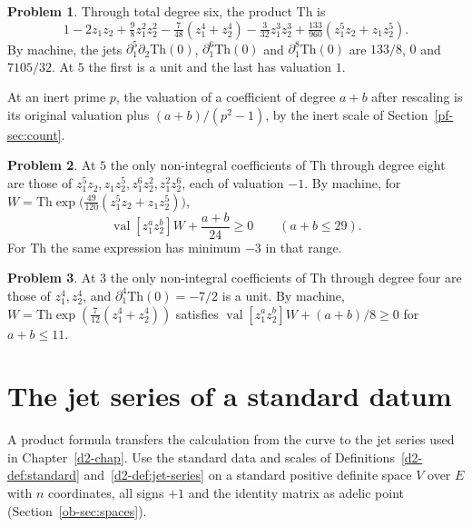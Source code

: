 \documentclass[reqno]{amsart}
\newcounter{chap}
\theoremstyle{plain}
\theoremstyle{definition}
\newtheorem{problem}{Problem}[section]
\theoremstyle{remark}
\newcommand{\val}{\operatorname{val}}
\newcommand{\Thm}{\mathrm{Th}}
\begin{document}
\begin{problem}\label{pr:jets}
Through total degree six, the product \(\Thm\) is
\[
 1-2z_1z_2+\tfrac98 z_1^2z_2^2-\tfrac7{48}(z_1^4+z_2^4)
   -\tfrac3{32}z_1^3z_2^3+\tfrac{133}{960}(z_1^5z_2+z_1z_2^5).
\]
By machine, the jets \(\partial_1^5\partial_2\Thm(0)\), \(\partial_1^6\Thm(0)\) and \(\partial_1^8\Thm(0)\) are \(133/8\), \(0\) and \(7105/32\).  At \(5\) the first is a unit and the last has valuation \(1\).
\end{problem}

At an inert prime \(p\), the valuation of a coefficient of degree \(a+b\) after rescaling is its original valuation plus \((a+b)/(p^2-1)\), by the inert scale of Section~\ref{pf-sec:count}.

\begin{problem}\label{pr:remove-five}
At \(5\) the only non-integral coefficients of \(\Thm\) through degree eight are those of \(z_1^5z_2,z_1z_2^5,z_1^6z_2^2,z_1^2z_2^6\), each of valuation \(-1\).
By machine, for \(W=\Thm\exp\bigl(\frac{49}{120}(z_1^5z_2+z_1z_2^5)\bigr)\),
\[
 \val[z_1^a z_2^b]W+\frac{a+b}{24}\ge0\qquad(a+b\le29).
\]
For \(\Thm\) the same expression has minimum \(-3\) in that range.
\end{problem}

\begin{problem}\label{pr:remove-three}
At \(3\) the only non-integral coefficients of \(\Thm\) through degree four are those of \(z_1^4,z_2^4\), and \(\partial_1^4\Thm(0)=-7/2\) is a unit.  By machine, \(W=\Thm\exp(\frac7{12}(z_1^4+z_2^4))\) satisfies \(\val[z_1^a z_2^b]W+(a+b)/8\ge0\) for \(a+b\le11\).
\end{problem}

\section{The jet series of a standard datum}\label{sec:standard}

A product formula transfers the calculation from the curve to the jet series used in Chapter~\ref{d2-chap}.  Use the standard data and scales of Definitions~\ref{d2-def:standard} and~\ref{d2-def:jet-series} on a standard positive definite space \(V\) over \(E\) with \(n\) coordinates, all signs \(+1\) and the identity matrix as adelic point (Section~\ref{ob-sec:spaces}).
\end{document}
